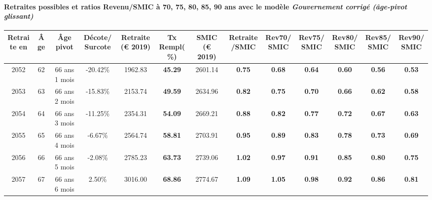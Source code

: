 \paragraph{Retraites possibles et ratios Revenu/SMIC à 70, 75, 80, 85, 90 ans avec le modèle \emph{Gouvernement corrigé (âge-pivot glissant)}}  
 
{ \scriptsize \begin{center} 
\begin{tabular}[htb]{|c|c||c|c||c|c||c||c|c|c|c|c|c|} 
\hline 
 Retraite en &  Âge &  Âge pivot &  Décote/Surcote &  Retraite (\euro{} 2019) &  Tx Rempl(\%) &  SMIC (\euro{} 2019) &  Retraite/SMIC &  Rev70/SMIC &  Rev75/SMIC &  Rev80/SMIC &  Rev85/SMIC &  Rev90/SMIC \\ 
\hline \hline 
 2052 &  62 &  66 ans 1 mois &  -20.42\% &  1962.83 &  {\bf 45.29} &  2601.14 &  {\bf {\color{red} 0.75}} &  {\bf {\color{red} 0.68}} &  {\bf {\color{red} 0.64}} &  {\bf {\color{red} 0.60}} &  {\bf {\color{red} 0.56}} &  {\bf {\color{red} 0.53}} \\ 
\hline 
 2053 &  63 &  66 ans 2 mois &  -15.83\% &  2153.74 &  {\bf 49.59} &  2634.96 &  {\bf {\color{red} 0.82}} &  {\bf {\color{red} 0.75}} &  {\bf {\color{red} 0.70}} &  {\bf {\color{red} 0.66}} &  {\bf {\color{red} 0.62}} &  {\bf {\color{red} 0.58}} \\ 
\hline 
 2054 &  64 &  66 ans 3 mois &  -11.25\% &  2354.31 &  {\bf 54.09} &  2669.21 &  {\bf {\color{red} 0.88}} &  {\bf {\color{red} 0.82}} &  {\bf {\color{red} 0.77}} &  {\bf {\color{red} 0.72}} &  {\bf {\color{red} 0.67}} &  {\bf {\color{red} 0.63}} \\ 
\hline 
 2055 &  65 &  66 ans 4 mois &  -6.67\% &  2564.74 &  {\bf 58.81} &  2703.91 &  {\bf {\color{red} 0.95}} &  {\bf {\color{red} 0.89}} &  {\bf {\color{red} 0.83}} &  {\bf {\color{red} 0.78}} &  {\bf {\color{red} 0.73}} &  {\bf {\color{red} 0.69}} \\ 
\hline 
 2056 &  66 &  66 ans 5 mois &  -2.08\% &  2785.23 &  {\bf 63.73} &  2739.06 &  {\bf 1.02} &  {\bf {\color{red} 0.97}} &  {\bf {\color{red} 0.91}} &  {\bf {\color{red} 0.85}} &  {\bf {\color{red} 0.80}} &  {\bf {\color{red} 0.75}} \\ 
\hline 
 2057 &  67 &  66 ans 6 mois &  2.50\% &  3016.00 &  {\bf 68.86} &  2774.67 &  {\bf 1.09} &  {\bf 1.05} &  {\bf {\color{red} 0.98}} &  {\bf {\color{red} 0.92}} &  {\bf {\color{red} 0.86}} &  {\bf {\color{red} 0.81}} \\ 
\hline 
\hline 
\end{tabular} 
\end{center} } 
